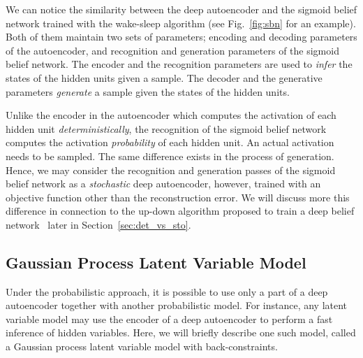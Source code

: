 \documentclass{now}
\begin{document}
We can notice the similarity between the deep autoencoder and the sigmoid belief
network trained with the wake-sleep algorithm (see Fig.~\ref{fig:sbn} for an
example). Both of them maintain two sets of parameters; encoding and decoding
parameters of the autoencoder, and recognition and generation parameters of the
sigmoid belief network. The encoder and the recognition parameters are used to
\textit{infer} the states of the hidden units given a sample. The decoder and
the generative parameters \textit{generate} a sample given the states of the
hidden units.

Unlike the encoder in the autoencoder which computes the activation of each
hidden unit \textit{deterministically}, the recognition of the sigmoid belief
network computes the activation \textit{probability} of each hidden unit. An
actual activation needs to be sampled. The same difference exists in the process
of generation. Hence, we may consider the recognition and generation passes of
the sigmoid belief network as a \textit{stochastic} deep autoencoder, however,
trained with an objective function other than the reconstruction error.  We will
discuss more this difference in connection to the up-down algorithm proposed to
train a deep belief network~\citep{Hinton2006nc} later in Section~\ref{sec:det_vs_sto}.

%

\subsection{Gaussian Process Latent Variable Model}

Under the probabilistic approach, it is possible to use only a part of a deep
autoencoder together with another probabilistic model. For instance, any latent
variable model may use the encoder of a deep autoencoder to perform a fast
inference of hidden variables. Here, we will briefly describe one such model,
called a Gaussian process latent variable model with back-constraints.
\end{document}

